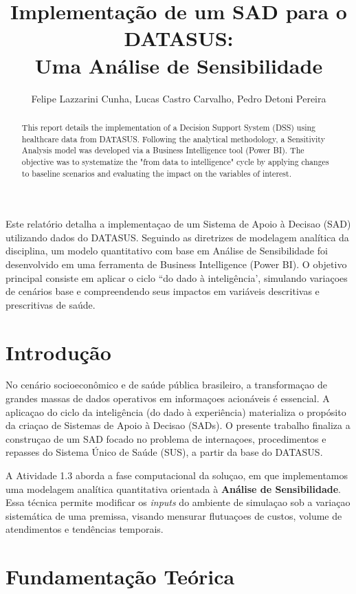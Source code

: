 \documentclass[12pt]{article}
\title{Implementação de um SAD para o DATASUS:\\Uma Análise de Sensibilidade}
\author{Felipe Lazzarini Cunha, Lucas Castro Carvalho, Pedro Detoni Pereira}
\begin{document}
\maketitle

\begin{abstract}
This report details the implementation of a Decision Support System (DSS) using healthcare data from DATASUS. Following the analytical methodology, a Sensitivity Analysis model was developed via a Business Intelligence tool (Power BI). The objective was to systematize the "from data to intelligence" cycle by applying changes to baseline scenarios and evaluating the impact on the variables of interest.
\end{abstract}

\begin{resumo}
Este relatório detalha a implementaçao de um Sistema de Apoio à Decisao (SAD) utilizando dados do DATASUS. Seguindo as diretrizes de modelagem analítica da disciplina, um modelo quantitativo com base em Análise de Sensibilidade foi desenvolvido em uma ferramenta de Business Intelligence (Power BI). O objetivo principal consiste em aplicar o ciclo ``do dado à inteligência', simulando variaçoes de cenários base e compreendendo seus impactos em variáveis descritivas e prescritivas de saúde.
\end{resumo}

\section{Introdução}
No cenário socioeconômico e de saúde pública brasileiro, a transformaçao de grandes massas de dados operativos em informaçoes acionáveis é essencial. A aplicaçao do ciclo da inteligência (do dado à experiência) materializa o propósito da criaçao de Sistemas de Apoio à Decisao (SADs). O presente trabalho finaliza a construçao de um SAD focado no problema de internaçoes, procedimentos e repasses do Sistema Único de Saúde (SUS), a partir da base do DATASUS.

A Atividade 1.3 aborda a fase computacional da soluçao, em que implementamos uma modelagem analítica quantitativa orientada à \textbf{Análise de Sensibilidade}. Essa técnica permite modificar os \textit{inputs} do ambiente de simulaçao sob a variaçao sistemática de uma premissa, visando mensurar flutuaçoes de custos, volume de atendimentos e tendências temporais.

\section{Fundamentação Teórica}
\end{document}
